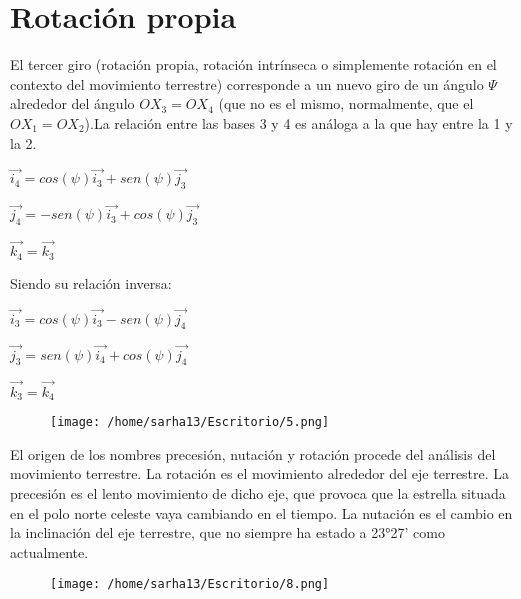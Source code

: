 \documentclass[12pt,a4paper]{report}
\begin{document}
\section{Rotación propia}
El tercer giro (rotación propia, rotación intrínseca o simplemente rotación en el contexto del movimiento terrestre) corresponde a un nuevo giro de un ángulo $\Psi$ alrededor del ángulo $OX_{3}=OX_{4}$ (que no es el mismo, normalmente, que el $OX_{1}=OX_{2}$).La relación entre las bases 3 y 4 es análoga a la que hay entre la 1 y la 2.
\begin{center}
$\overrightarrow{i_{4}}=cos(\psi)\overrightarrow{i_{3}}+sen(\psi)\overrightarrow{j_{3}}$

$\overrightarrow{j_{4}}=-sen(\psi)\overrightarrow{i_{3}}+cos(\psi)\overrightarrow{j_{3}}$

$\overrightarrow{k_{4}}=\overrightarrow{k_{3}}$
\end{center}
Siendo su relación inversa:
\begin{center}
$\overrightarrow{i_{3}}=cos(\psi)\overrightarrow{i_{3}}-sen(\psi)\overrightarrow{j_{4}}$

$\overrightarrow{j_{3}}=sen(\psi)\overrightarrow{i_{4}}+cos(\psi)\overrightarrow{j_{4}}$

$\overrightarrow{k_{3}}=\overrightarrow{k_{4}}$
\end{center}
\begin{center}
\begin{figure}[htp]
\centering
\texttt{[image: /home/sarha13/Escritorio/5.png]}
\caption{}
\label{}
\end{figure}
\end{center} 
El origen de los nombres precesión, nutación y rotación procede del análisis del movimiento terrestre. La rotación es el movimiento alrededor del eje terrestre. La precesión es el lento movimiento de dicho eje, que provoca que la estrella situada en el polo norte celeste vaya cambiando en el tiempo. La nutación es el cambio en la inclinación del eje terrestre, que no siempre ha estado a 23°27' como actualmente.
\begin{center}
\begin{figure}[htp]
\centering
\texttt{[image: /home/sarha13/Escritorio/8.png]}
\caption{}
\label{}
\end{figure}
\end{center} 
\end{document}
